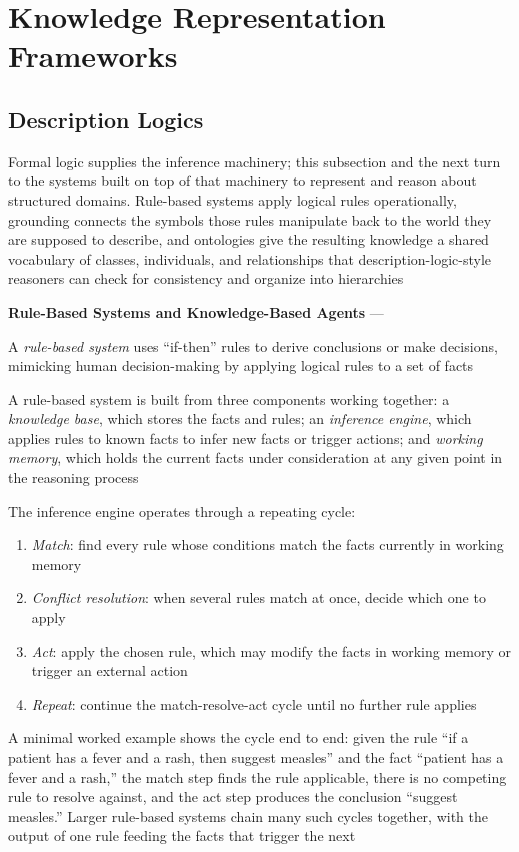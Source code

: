 \section{Knowledge Representation Frameworks}
\label{sec:knowledge-representation-frameworks}

\subsection{Description Logics}
\label{subsec:description-logics}

Formal logic supplies the inference machinery; this subsection and the
next turn to the systems built on top of that machinery to represent and
reason about structured domains. Rule-based systems apply logical rules
operationally, grounding connects the symbols those rules manipulate back
to the world they are supposed to describe, and ontologies give the
resulting knowledge a shared vocabulary of classes, individuals, and
relationships that description-logic-style reasoners can check for
consistency and organize into hierarchies

\textbf{Rule-Based Systems and Knowledge-Based Agents} --- \begin{definition}
  A \emph{rule-based system} uses ``if-then'' rules to derive conclusions or
  make decisions, mimicking human decision-making by applying logical rules
  to a set of facts
\end{definition}
A rule-based system is built from three components working together: a
\emph{knowledge base}, which stores the facts and rules; an \emph{inference
engine}, which applies rules to known facts to infer new facts or trigger
actions; and \emph{working memory}, which holds the current facts under
consideration at any given point in the reasoning process

The inference engine operates through a repeating cycle:
\begin{enumerate}
  \item \emph{Match}: find every rule whose conditions match the facts
    currently in working memory

  \item \emph{Conflict resolution}: when several rules match at once,
    decide which one to apply

  \item \emph{Act}: apply the chosen rule, which may modify the facts in
    working memory or trigger an external action

  \item \emph{Repeat}: continue the match-resolve-act cycle until no
    further rule applies
\end{enumerate}
A minimal worked example shows the cycle end to end: given the rule ``if a
patient has a fever and a rash, then suggest measles'' and the fact
``patient has a fever and a rash,'' the match step finds the rule
applicable, there is no competing rule to resolve against, and the act step
produces the conclusion ``suggest measles.'' Larger rule-based systems
chain many such cycles together, with the output of one rule feeding the
facts that trigger the next

